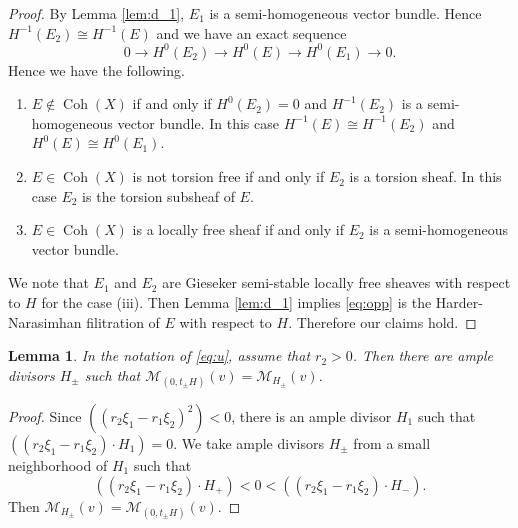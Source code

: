 \documentclass[10pt]{amsart}
\def\cal{\mathcal}
\newcommand{\Coh}{\operatorname{Coh}}
\numberwithin{equation}{section}
\theoremstyle{plain}
\newtheorem{lem}[thm]{Lemma}
\theoremstyle{definition}
\theoremstyle{remark}
\begin{document}
\begin{proof}
By Lemma \ref{lem:d_1},  $E_1$ is a semi-homogeneous vector bundle.
Hence $H^{-1}(E_2) \cong H^{-1}(E)$ and 
we have an exact sequence
\begin{equation}
0 \to H^0(E_2) \to H^0(E) \to H^0(E_1) \to 0.
\end{equation}
Hence we have the following.
\begin{enumerate}
\item
$E \not \in \Coh(X)$ if and only if $H^0(E_2)=0$ and
$H^{-1}(E_2)$ is a semi-homogeneous vector bundle. 
In this case $H^{-1}(E) \cong H^{-1}(E_2)$ and $H^0(E) \cong H^0(E_1)$.  
\item
$E \in \Coh(X)$ is not torsion free if and only if $E_2$ is a torsion sheaf.
In this case $E_2$ is the torsion subsheaf of $E$.
\item
$E \in \Coh(X)$ is a locally free sheaf if and only if $E_2$ is a semi-homogeneous vector bundle.
\end{enumerate}
We note that $E_1$ and $E_2$ are Gieseker semi-stable locally free sheaves
with respect to $H$ for the case (iii).  Then Lemma \ref{lem:d_1} implies
\eqref{eq:opp} is the Harder-Narasimhan filitration of $E$
with respect to
$H$. Therefore our claims hold.
\end{proof}







\begin{lem}\label{lem:H_pm}
In the notation of \eqref{eq:u}, assume that $r_2>0$.
Then there are ample divisors $H_\pm$ such that
${\cal M}_{(0,t_\pm H)}(v)={\cal M}_{H_\pm}(v)$.
\end{lem}


\begin{proof}
Since
$((r_2 \xi_1-r_1 \xi_2)^2)<0$, there is an ample divisor $H_1$ such that
$((r_2 \xi_1-r_1 \xi_2) \cdot H_1)=0$.
We take ample divisors $H_\pm$ from a small neighborhood of $H_1$  
such that 
$$
((r_2 \xi_1-r_1 \xi_2) \cdot H_+)<0<((r_2 \xi_1-r_1 \xi_2) \cdot H_-).
$$
Then ${\cal M}_{H_\pm}(v)={\cal M}_{(0,t_\pm H)}(v)$. 
\end{proof}
\end{document}
